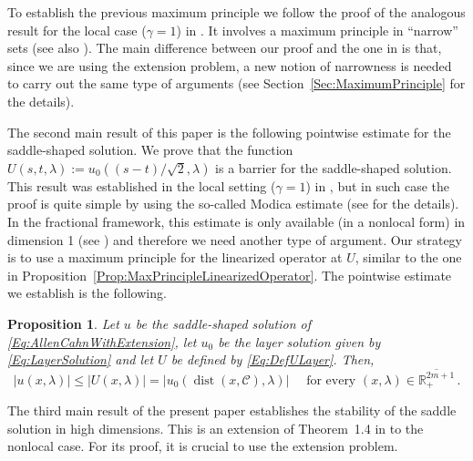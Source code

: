 \documentclass[twoside,leqno,symbols-for-thanks, draft]{rmi}
\numberwithin{equation}{section}
\newtheorem{proposition}[theorem]{Proposition}
\theoremstyle{definition}
\newcommand{\con}[1]{\mathbb{#1}}
\newcommand{\R}{\con{R}} %
\newcommand{\ccal}{\mathscr{C}}
\newcommand{\s}{\gamma}
\DeclareMathOperator{\dist}{dist}
\begin{document}
To establish the previous maximum principle we follow the proof of the analogous result for the local case ($\s = 1$) in \cite{Cabre-Saddle}. It involves a maximum principle in ``narrow'' sets (see also \cite{Cabre-Topics,BerestyckiNirembergVaradhan}). The main difference between our proof and the one in \cite{Cabre-Saddle} is that, since we are using the extension problem, a new notion of narrowness is needed to carry out the same type of arguments (see Section~\ref{Sec:MaximumPrinciple} for the details).




The second main result of this paper is the following pointwise estimate for the saddle-shaped solution. We prove that the function $U(s,t,\lambda) := u_0 ( (s-t)/\sqrt{2}, \lambda)$ is a barrier for the saddle-shaped solution. This result was established in the local setting ($\s = 1$) in \cite{CabreTerraI}, but in such case the proof is quite simple by using the so-called Modica estimate (see \cite{CabreTerraI} for the details). In the fractional framework, this estimate is only available (in a nonlocal form) in dimension 1 (see \cite{CabreSolaMorales, CabreSireI}) and therefore we need another type of argument. Our strategy is to use a maximum principle for the linearized operator at $U$, similar to the one in Proposition~\ref{Prop:MaxPrincipleLinearizedOperator}. The pointwise estimate we establish is the following.

\begin{proposition}
	\label{Prop:SaddleUnderLayer}
	Let $u$ be the saddle-shaped solution of \eqref{Eq:AllenCahnWithExtension},  let $u_0$ be the layer solution given by \eqref{Eq:LayerSolution} and let $U$ be defined by \eqref{Eq:DefULayer}. Then, 
	\begin{equation}
	\label{Eq:SaddleUnderLayer}
	|u(x,\lambda)| \leq |U(x,\lambda)| = |u_0 ( \dist(x, \ccal), \lambda) | \quad \text{ for every } (x,\lambda)\in \overline{\R^{2m+1}_+}\,.
	\end{equation}
\end{proposition}



The third main result of the present paper establishes the stability of the saddle solution in high dimensions. This is an extension of Theorem~1.4 in \cite{Cabre-Saddle} to the nonlocal case. For its proof, it is crucial to use the extension problem.
\end{document}
